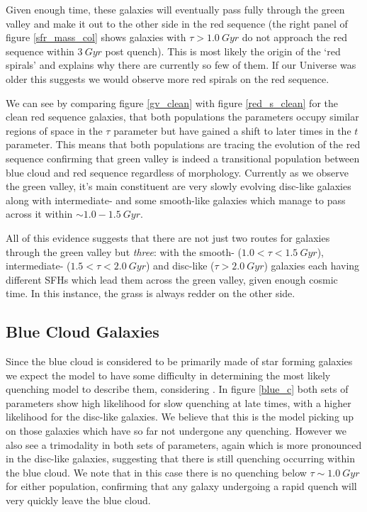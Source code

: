 \documentclass{mn2e}
\begin{document}
Given enough time, these galaxies will eventually pass fully through the green valley and make it out to the other side in the red sequence (the right panel of figure \ref{sfr_mass_col} shows galaxies with $\tau > 1.0~Gyr$ do not approach the red sequence within $3~Gyr$ post quench). This is most likely the origin of the `red spirals' and explains why there are currently so few of them. If our Universe was older this suggests we would observe more red spirals on the red sequence. 

We can see by comparing figure \ref{gv_clean} with figure \ref{red_s_clean} for the clean red sequence galaxies, that both populations the parameters occupy similar regions of space in the $\tau$ parameter but have gained a shift to later times in the $t$ parameter. This means that both populations are tracing the evolution of the red sequence confirming that green valley is indeed a transitional population between blue cloud and red sequence regardless of morphology. Currently as we observe the green valley, it's main constituent are very slowly evolving disc-like galaxies along with intermediate- and some smooth-like galaxies which manage to pass across it within $\sim 1.0-1.5~Gyr$.

All of this evidence suggests that there are not just two routes for galaxies through the green valley but \emph{three}: with the smooth- ($1.0 < \tau < 1.5 ~Gyr$), intermediate- ($1.5 < \tau < 2.0~Gyr$) and disc-like ($\tau > 2.0~Gyr$) galaxies each having different SFHs which lead them across the green valley, given enough cosmic time. In this instance, the grass is always redder on the other side.


\subsection{Blue Cloud Galaxies}
Since the blue cloud is considered to be primarily made of star forming galaxies we expect the model to have some difficulty in determining the most likely quenching model to describe them, considering . In figure \ref{blue_c} both sets of parameters show high likelihood for slow quenching at late times, with a higher likelihood for the disc-like galaxies. We believe that this is the model picking up on those galaxies which have so far not undergone any quenching. However we also see a trimodality in both sets of parameters, again which is more pronounced in the disc-like galaxies, suggesting that there is still quenching occurring within the blue cloud. We note that in this case there is no quenching below $\tau \sim 1.0~Gyr$ for either population, confirming that any galaxy undergoing a rapid quench will very quickly leave the blue cloud. 
\end{document}
